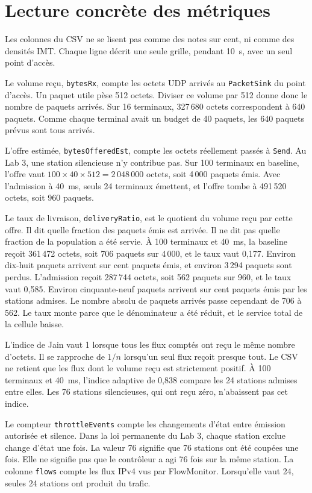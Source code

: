 \documentclass[11pt,a4paper]{article}
\begin{document}
\section{Lecture concrète des métriques}

Les colonnes du CSV ne se lisent pas comme des notes sur cent, ni comme des densités IMT. Chaque ligne décrit une seule grille, pendant 10~s, avec un seul point d'accès.

Le volume reçu, \texttt{bytesRx}, compte les octets UDP arrivés au \texttt{PacketSink} du point d'accès. Un paquet utile pèse 512 octets. Diviser ce volume par 512 donne donc le nombre de paquets arrivés. Sur 16 terminaux, 327\,680 octets correspondent à 640 paquets. Comme chaque terminal avait un budget de 40 paquets, les 640 paquets prévus sont tous arrivés.

L'offre estimée, \texttt{bytesOfferedEst}, compte les octets réellement passés à \texttt{Send}. Au Lab 3, une station silencieuse n'y contribue pas. Sur 100 terminaux en baseline, l'offre vaut $100 \times 40 \times 512 = 2\,048\,000$ octets, soit 4\,000 paquets émis. Avec l'admission à 40~ms, seuls 24 terminaux émettent, et l'offre tombe à 491\,520 octets, soit 960 paquets.

Le taux de livraison, \texttt{deliveryRatio}, est le quotient du volume reçu par cette offre. Il dit quelle fraction des paquets émis est arrivée. Il ne dit pas quelle fraction de la population a été servie. À 100 terminaux et 40~ms, la baseline reçoit 361\,472 octets, soit 706 paquets sur 4\,000, et le taux vaut 0,177. Environ dix-huit paquets arrivent sur cent paquets émis, et environ 3\,294 paquets sont perdus. L'admission reçoit 287\,744 octets, soit 562 paquets sur 960, et le taux vaut 0,585. Environ cinquante-neuf paquets arrivent sur cent paquets émis par les stations admises. Le nombre absolu de paquets arrivés passe cependant de 706 à 562. Le taux monte parce que le dénominateur a été réduit, et le service total de la cellule baisse.

L'indice de Jain vaut 1 lorsque tous les flux comptés ont reçu le même nombre d'octets. Il se rapproche de $1/n$ lorsqu'un seul flux reçoit presque tout. Le CSV ne retient que les flux dont le volume reçu est strictement positif. À 100 terminaux et 40~ms, l'indice adaptive de 0,838 compare les 24 stations admises entre elles. Les 76 stations silencieuses, qui ont reçu zéro, n'abaissent pas cet indice.

Le compteur \texttt{throttleEvents} compte les changements d'état entre émission autorisée et silence. Dans la loi permanente du Lab 3, chaque station exclue change d'état une fois. La valeur 76 signifie que 76 stations ont été coupées une fois. Elle ne signifie pas que le contrôleur a agi 76 fois sur la même station. La colonne \texttt{flows} compte les flux IPv4 vus par FlowMonitor. Lorsqu'elle vaut 24, seules 24 stations ont produit du trafic.
\end{document}
